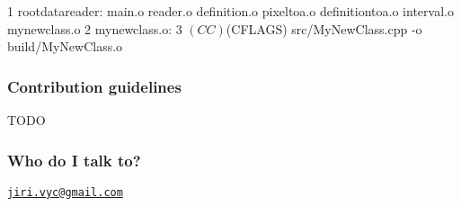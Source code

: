 \begin{DoxyCode}
1 rootdatareader: main.o reader.o definition.o pixeltoa.o definitiontoa.o interval.o mynewclass.o
2 mynewclass.o:
3     $(CC) $(CFLAGS) src/MyNewClass.cpp -o build/MyNewClass.o
\end{DoxyCode}


\subsubsection*{Contribution guidelines}


\begin{DoxyItemize}
\item T\+O\+D\+O
\end{DoxyItemize}

\subsubsection*{Who do I talk to?}

\href{mailto:jiri.vyc@gmail.com}{\tt jiri.\+vyc@gmail.\+com} 